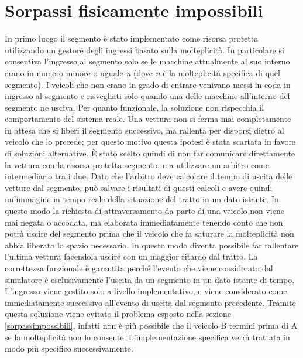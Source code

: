 \section{Sorpassi fisicamente impossibili}

In primo luogo il segmento è stato implementato come risorsa protetta utilizzando un gestore degli ingressi basato sulla molteplicità. In particolare si consentiva l'ingresso al segmento solo se le macchine attualmente al suo interno erano in numero minore o uguale \emph{n} (dove \emph{n} è la molteplicità specifica di quel segmento). I veicoli che non erano in grado di entrare venivano messi in coda in ingresso al segmento e risvegliati solo quando una delle macchine all'interno del segmento ne usciva.
Per quanto funzionale, la soluzione non rispecchia il comportamento del sistema reale. Una vettura non si ferma mai completamente in attesa che si liberi il segmento successivo, ma rallenta per disporsi dietro al veicolo che lo precede; per questo motivo questa ipotesi è stata scartata in favore di soluzioni alternative.
È stato scelto quindi di non far comunicare direttamente la vettura con la risorsa protetta segmento, ma utilizzare un arbitro come intermediario tra i due. Dato che l'arbitro deve calcolare il tempo di uscita delle vetture dal segmento, può salvare i risultati di questi calcoli e avere quindi un'immagine in tempo reale della situazione del tratto in un dato istante. In questo modo la richiesta di attraversamento da parte di una veicolo non viene mai negata o accodata, ma elaborata immediatamente tenendo conto che non potrà uscire del segmento prima che il veicolo che fa saturare la molteplicità non abbia liberato lo spazio necessario. In questo modo diventa possibile far rallentare l'ultima vettura facendola uscire con un maggior ritardo dal tratto.
La correttezza funzionale è garantita perché l'evento che viene considerato dal simulatore è esclusivamente l'uscita da un segmento in un dato istante di tempo. L'ingresso viene gestito solo a livello implementativo, e viene considerato come immediatamente successivo all'evento di uscita dal segmento precedente.
Tramite questa soluzione viene evitato il problema esposto nella sezione \ref{sorpassimpossibili}, infatti non è più possibile che il veicolo B termini prima di A se la molteplicità non lo consente.
L'implementazione specifica verrà trattata in modo più specifico successivamente.